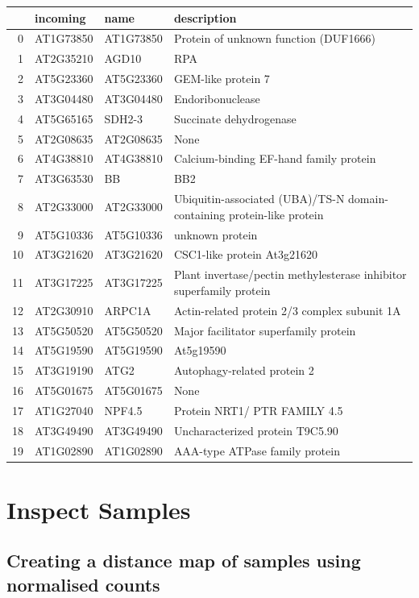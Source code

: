 \documentclass[a4paper]{article}
\begin{document}
\begin{center}
\begin{tabular}{rlll}
 & incoming & name & description\\
\hline
0 & AT1G73850 & AT1G73850 & Protein of unknown function (DUF1666)\\
1 & AT2G35210 & AGD10 & RPA\\
2 & AT5G23360 & AT5G23360 & GEM-like protein 7\\
3 & AT3G04480 & AT3G04480 & Endoribonuclease\\
4 & AT5G65165 & SDH2-3 & Succinate dehydrogenase\\
5 & AT2G08635 & AT2G08635 & None\\
6 & AT4G38810 & AT4G38810 & Calcium-binding EF-hand family protein\\
7 & AT3G63530 & BB & BB2\\
8 & AT2G33000 & AT2G33000 & Ubiquitin-associated (UBA)/TS-N domain-containing protein-like protein\\
9 & AT5G10336 & AT5G10336 & unknown protein\\
10 & AT3G21620 & AT3G21620 & CSC1-like protein At3g21620\\
11 & AT3G17225 & AT3G17225 & Plant invertase/pectin methylesterase inhibitor superfamily protein\\
12 & AT2G30910 & ARPC1A & Actin-related protein 2/3 complex subunit 1A\\
13 & AT5G50520 & AT5G50520 & Major facilitator superfamily protein\\
14 & AT5G19590 & AT5G19590 & At5g19590\\
15 & AT3G19190 & ATG2 & Autophagy-related protein 2\\
16 & AT5G01675 & AT5G01675 & None\\
17 & AT1G27040 & NPF4.5 & Protein NRT1/ PTR FAMILY 4.5\\
18 & AT3G49490 & AT3G49490 & Uncharacterized protein T9C5.90\\
19 & AT1G02890 & AT1G02890 & AAA-type ATPase family protein\\
\end{tabular}
\end{center}

\clearpage

\section{Inspect Samples}
\label{sec:orge2aba67}

\subsection{Creating a distance map of samples using normalised counts}
\label{sec:orgf6d54a1}
\end{document}
